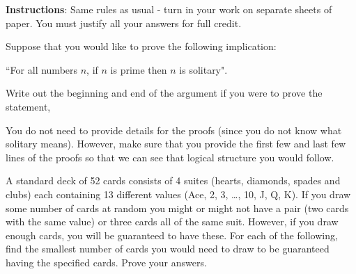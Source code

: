 \documentclass[11pt]{exam}
\begin{document}
\noindent \textbf{Instructions}: Same rules as usual - turn in your work on separate sheets of paper.  You must justify all your answers for full credit.

\begin{questions}
\question[9] Suppose that you would like to prove the following implication: 
\begin{center}
``For all numbers $n$, if $n$ is prime then $n$ is solitary". 
\end{center}
Write out the beginning and end of the argument if you were to prove the statement, 
You do not need to provide details for the proofs (since you do not know what solitary means). However, make sure that you provide the first few and last few lines of the proofs so that we can see that logical structure you would follow.



\question[9] A standard deck of 52 cards consists of 4 suites (hearts, diamonds, spades and clubs) each containing 13 different values (Ace, 2, 3, \ldots, 10, J, Q, K).  If you draw some number of cards at random you might or might not have a pair (two cards with the same value) or three cards all of the same suit.  However, if you draw enough cards, you will be guaranteed to have these.  For each of the following, find the smallest number of cards you would need to draw to be guaranteed having the specified cards.  Prove your answers.
\begin{parts}

\end{parts}
\end{questions}
\end{document}
